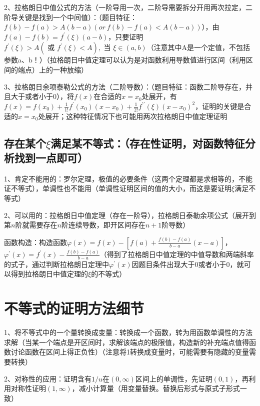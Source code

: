 2、拉格朗日中值公式的方法（一阶导用一次，二阶导需要拆分开用两次拉定，二阶导关键是找到一个中间值）：（题目特征：$f(b)-f(a)>A(b-a)(or \ f(b)-f(a)<A(b-a))$），由$f(a)-f(b)=f^{\prime}(\xi)(a-b)$，只要证明$f^{\prime}(\xi)>A\left(\text { 或 } f^{\prime}(\xi)<A\right), \text { 当 } \xi \in(a, b)$（注意其中A是一个定值，不包括参数a、b！）（拉格朗日中值定理可以认为是对函数利用导数值进行区间（利用区间的端点）上的一种放缩）

3、拉格朗日余项泰勒公式的方法（二阶导数）：（题目特征：函数二阶导存在，并且大于或者小于0），将$f(x)$在合适的$x=x_0$处展开，有$f(x)=f\left(x_{0}\right)+\frac{1}{1 !} f^{\prime}\left(x_{0}\right)\left(x-x_{0}\right)+\frac{1}{2 !} f^{\prime \prime}(\xi)\left(x-x_{0}\right)^{2}$，证明的关键是合适的$x=x_0$处展开；这种特征情况下也可能用两次拉格朗日中值定理证明



\subsection{存在某个$\xi$满足某不等式：（存在性证明，对函数特征分析找到一点即可）}

1、肯定不能用的：罗尔定理，极值的必要条件（这两个定理都是求相等的，不能证不等式），单调性也不能用（单调性证明区间的值的大小，而这是要证明$\xi$满足不等式）

2、可以用的：拉格朗日中值定理（存在一阶导），拉格朗日泰勒余项公式（展开到第$n$阶就需要存在$n$阶连续导数，即开区间存在$n+1$阶导数）

函数构造：构造函数$\varphi(x)=f(x)-\left[f(a)+\frac{f(b)-f(a)}{b-a}(x-a)\right]$，$\varphi^{\prime}(x)=f^{\prime}(x)-\frac{f(b)-f(a)}{b-a}$（得到了拉格朗日中值定理的中值导数和两端斜率的式子，通过判断拉格朗日定理中$\varphi^{\prime}(x)$因题目条件出现大于0或者小于0，就可以得到拉格朗日中值定理的$\xi$的不等式）



\section{不等式的证明方法细节}

1、将不等式中的一个量转换成变量：转换成一个函数，转为用函数单调性的方法求解（当某一个端点是开区间时，求解该端点的极限值，构造新的补充端点值得函数讨论函数在区间上得正负性）（注意将1转换成变量时，可能需要有隐藏的变量需要转换）

2、对称性的应用：证明含有$1/u$在$(0,\infty)$区间上的单调性，先证明$(0,1)$，再利用对称性证明$(1,\infty)$，减小计算量（用变量替换。替换后形式与原式子形式一致）

